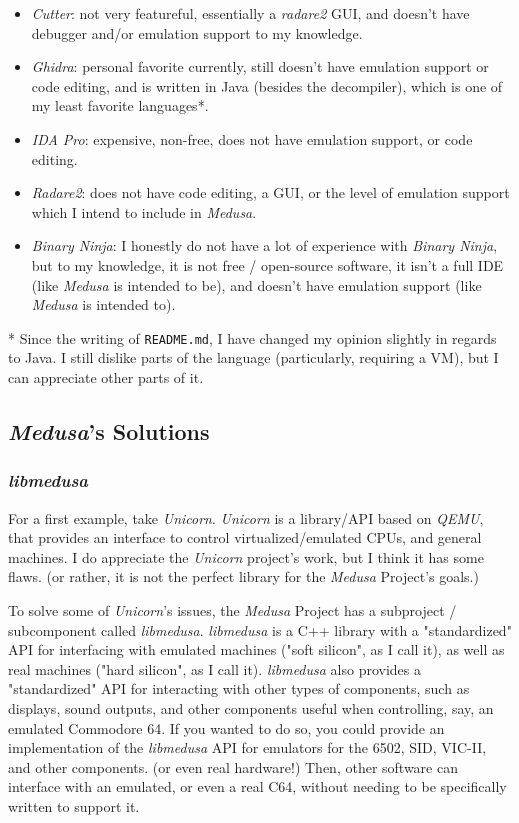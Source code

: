 \documentclass{article}
\begin{document}
	\begin{itemize}
		\item \textit{Cutter}: not very featureful, essentially a
		\textit{radare2} GUI, and doesn't have debugger and/or emulation support
		to my knowledge.
		\item \textit{Ghidra}: personal favorite currently, still doesn't have
		emulation support or code editing, and is written in Java (besides the
		decompiler), which is one of my least favorite languages*.
		\item \textit{IDA Pro}: expensive, non-free, does not have emulation
		support, or code editing.
		\item \textit{Radare2}: does not have code editing, a GUI, or the level
		of emulation support which I intend to include in \textit{Medusa}.
		\item \textit{Binary Ninja}: I honestly do not have a lot of experience
		with \textit{Binary Ninja}, but to my knowledge, it is not free / 
		open-source software, it isn't a full IDE (like \textit{Medusa} is
		intended to be), and doesn't have emulation support (like
		\textit{Medusa} is intended to).
	\end{itemize}

	* Since the writing of \texttt{README.md}, I have changed my opinion slightly
	in regards to Java. I still dislike parts of the language (particularly,
	requiring a VM), but I can appreciate other parts of it.

	\subsection{\textit{Medusa}'s Solutions}
	\subsubsection{\textit{libmedusa}}
	For a first example, take \textit{Unicorn}. \textit{Unicorn} is a
	library/API based on \textit{QEMU}, that provides an interface to control
	virtualized/emulated CPUs, and general machines. I do appreciate the
	\textit{Unicorn} project's work, but I think it has some flaws. (or rather,
	it is not the perfect library for the \textit{Medusa} Project's goals.)

	To solve some of \textit{Unicorn}'s issues, the \textit{Medusa} Project has
	a subproject / subcomponent called \textit{libmedusa}. \textit{libmedusa} is
	a C++ library with a "standardized" API for interfacing with emulated
	machines ("soft silicon", as I call it), as well as real machines ("hard
	silicon", as I call it). \textit{libmedusa} also provides a "standardized"
	API for interacting with other types of components, such as displays, sound
	outputs, and other components useful when controlling, say, an emulated
	Commodore 64. If you wanted to do so, you could provide an implementation of
	the \textit{libmedusa} API for emulators for the 6502, SID, VIC-II, and
	other components. (or even real hardware!) Then, other software can
	interface with an emulated, or even a real C64, without needing to be
	specifically written to support it.
\end{document}
